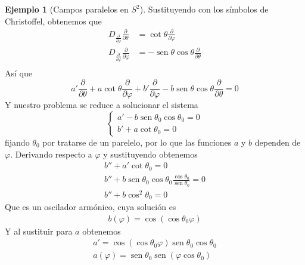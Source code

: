 \documentclass[spanish]{book}
\theoremstyle{definition}
\newtheorem*{ejem}{Ejemplo}
\DeclareMathOperator{\sen}{sen}
\begin{document}
\begin{ejem}[Campos paralelos en $S^2$]
	Sustituyendo con los símbolos de Christoffel, obtenemos que
	\begin{align*}
		D_{\frac{\partial}{\partial \varphi}}\frac{\partial}{\partial \theta}&=\cot\theta\frac{\partial}{\partial \varphi}\\
		D_{\frac{\partial}{\partial \varphi}}\frac{\partial}{\partial \varphi}&=-\sen\theta\cos\theta\frac{\partial}{\partial \theta}\\
	\end{align*}
	Así que
	\[a'\frac{\partial}{\partial\theta}+a\cot\theta\frac{\partial}{\partial \varphi}+b'\frac{\partial}{\partial\varphi}-b\sen\theta\cos\theta\frac{\partial}{\partial \theta}=0\]
	Y nuestro problema se reduce a solucionar el sistema
	\[\begin{cases}
		a'-b\sen\theta_0\cos\theta_0=0\\
		b'+a\cot\theta_0=0
	\end{cases}\]
	fijando $\theta_0$ por tratarse de un parelelo, por lo que las funciones $a$ y $b$ dependen de $\varphi$. Derivando respecto a $\varphi$ y sustituyendo obtenemos
	\begin{align*}
		b''+a'\cot\theta_0=0\\
		b''+b\sen\theta_0\cos\theta_0\frac{\cos\theta_0}{\sen\theta_0}=0\\
		b''+b\cos^2\theta_0=0
	\end{align*}
	Que es un oscilador armónico, cuya solución es
	\begin{align*}
		b(\varphi)=\cos(\cos\theta_0\varphi)
	\end{align*}
	Y al sustituir para $a$ obtenemos
	\begin{align*}
		a'=\cos(\cos\theta_0\varphi)\sen\theta_0\cos\theta_0\\
		a(\varphi)=\sen\theta_0\sen(\varphi\cos\theta_0)
	\end{align*}
	

\end{ejem}
\end{document}

